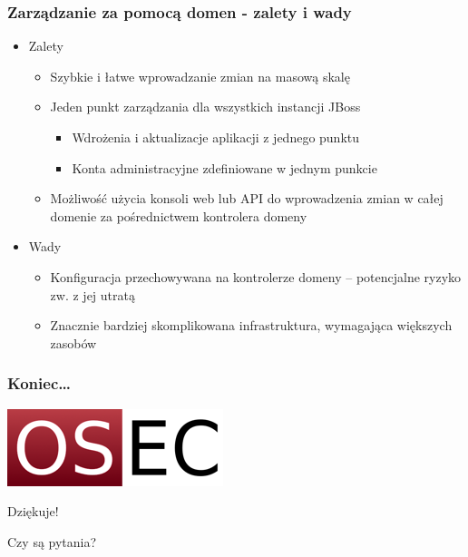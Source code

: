 \documentclass[dvipsnames,table]{beamer}
\begin{document}
\begin{frame}
\frametitle{Zarządzanie za pomocą domen - zalety i wady}
\begin{itemize}
	\item Zalety
	\begin{itemize}
		\item Szybkie i łatwe wprowadzanie zmian na masową skalę
		\item Jeden punkt zarządzania dla wszystkich instancji JBoss
		\begin{itemize}
			\item Wdrożenia i aktualizacje aplikacji z jednego punktu
			\item Konta administracyjne zdefiniowane w jednym punkcie
		\end{itemize}
		\item Możliwość użycia konsoli web lub API do wprowadzenia zmian w całej domenie za pośrednictwem kontrolera domeny
	\end{itemize}
	\item Wady
	\begin{itemize}
		\item Konfiguracja przechowywana na kontrolerze domeny -- potencjalne ryzyko zw. z jej utratą
		\item Znacznie bardziej skomplikowana infrastruktura, wymagająca większych zasobów
	\end{itemize}
\end{itemize}
\end{frame}

\begin{frame}
\frametitle{Koniec\ldots}
\begin{center}
\includegraphics[scale=0.5]{img-oseclogo.png}

Dziękuje!

Czy są pytania?
\end{center}

\end{frame}

 
\end{document}
